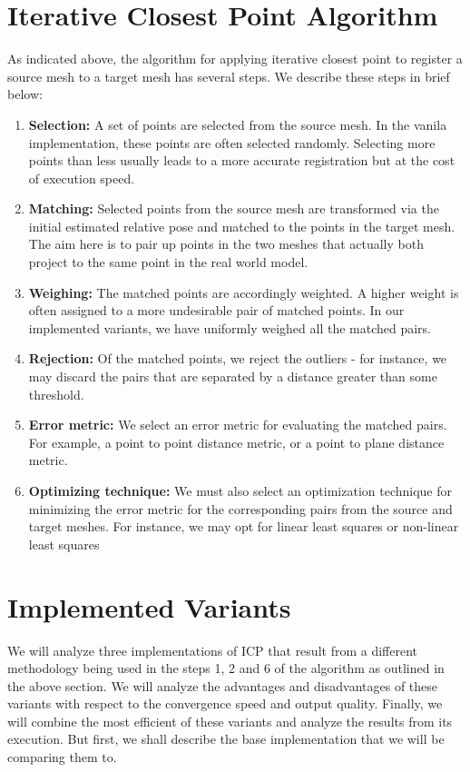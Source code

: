 \documentclass[a4paper,pagesize 10pt]{scrartcl}
\begin{document}
\section*{Iterative Closest Point Algorithm}
As indicated above, the algorithm for applying iterative closest point to register a source mesh to a target mesh has several steps. We describe these steps in brief below:
\begin{enumerate}
    \item \textbf{Selection:} A set of points are selected from the source mesh. In the vanila implementation, these points are often selected randomly. Selecting more points than less usually leads to a more accurate registration but at the cost of execution speed. 
    \item \textbf{Matching:} Selected points from the source mesh are transformed via the initial estimated relative pose and matched to the points in the target mesh. The aim here is to pair up points in the two meshes that actually both project to the same point in the real world model.
    \item \textbf{Weighing:} The matched points are accordingly weighted. A higher weight is often assigned to a more undesirable pair of matched points. In our implemented variants, we have uniformly weighed all the matched pairs.
    \item \textbf{Rejection:} Of the matched points, we reject the outliers - for instance, we may discard the pairs that are separated by a distance greater than some threshold.
    \item \textbf{Error metric:} We select an error metric for evaluating the matched pairs. For example, a point to point distance metric, or a point to plane distance metric.
    \item \textbf{Optimizing technique:} We must also select an optimization technique for minimizing the error metric for the corresponding pairs from the source and target meshes. For instance, we may opt for linear least squares or non-linear least squares 
\end{enumerate} 

\section*{Implemented Variants}
We will analyze three implementations of ICP that result from a different methodology being used in the steps 1, 2 and 6 of the algorithm as outlined in the above section. We will analyze the advantages and disadvantages of these variants with respect to the convergence speed and output quality. Finally, we will combine the most efficient of these variants and analyze the results from its execution. But first, we shall describe the base implementation that we will be comparing them to.
\end{document}
